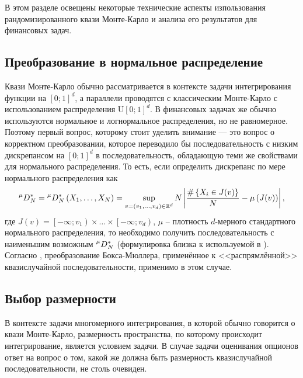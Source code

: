 В этом разделе освещены некоторые технические аспекты изпользования рандомизированного квази Монте-Карло и анализа его результатов для финансовых задач. %

\subsection{Преобразование в нормальное распределение} %
\label{sub:qmc:option_pricing:uniform_normal_transform}

Квази Монте-Карло обычно рассматривается в контексте задачи интегрирования функции на $\left[0;1\right]^d$, а параллели проводятся с классическим Монте-Карло с использованием распределения $\mathrm U\left[0;1\right]^d$. В финансовых задачах же обычно используются нормальное и логнормальное распределения, но не равномерное. Поэтому первый вопрос, которому стоит уделить внимание --- это вопрос о корректном преобразовании, которое переводило бы последовательность с низким дискрепансом на $\left[0;1\right]^d$ в последовательность, обладающую теми же свойствами для нормального распределения. То есть, если определить дискрепанс по мере нормального распределения как 
$$\prescript{\mu}{}D_N^* = \prescript{\mu}{}D_N^*\left(X_1, \dots, X_N\right) = \sup_{v = (v_1, \dots, v_d) \in {\mathbb R^d}} N \left\lvert\frac{\#\left\{ X_i \in J(v) \right\}}{N} - \mu\left(J(v)\right)\right\rvert,$$
где $J(v) = \left[-\infty; v_1\right) \times \dots \times \left[-\infty; v_d\right)$, $\mu$ -- плотность $d$-мерного стандартного нормального распределения, то необходимо получить последовательность с наименьшим возможным $\prescript{\mu}{}D_N^*$ (формулировка близка к используемой в \cite{Oekten2011}). Согласно \cite{Oekten2011}, преобразование Бокса-Мюллера, применённое к <<распрямлённой>> квазислучайной последовательности, применимо в этом случае.


\subsection{Выбор размерности} %
\label{sub:qmc:option_pricing:choice_of_dimension}

В контексте задачи многомерного интегрирования, в которой обычно говорится о квази Монте-Карло, размерность пространства, по которому происходит интегрирование, является условием задачи. В случае задачи оценивания опционов ответ на вопрос о том, какой же должна быть размерность квазислучайной последовательности, не столь очевиден.

